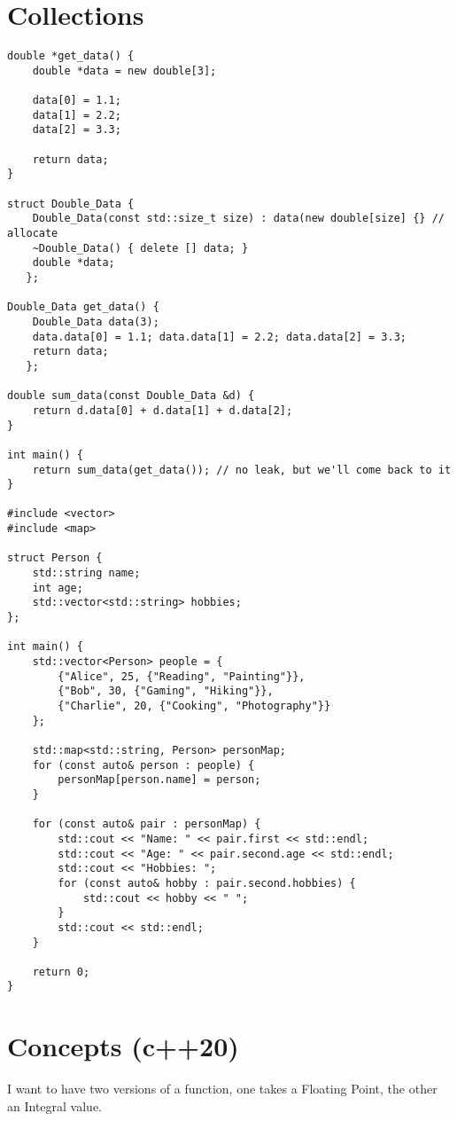 \documentclass[openany]{report}
\begin{document}
\section{Collections}

\begin{verbatim}
double *get_data() {
    double *data = new double[3];

    data[0] = 1.1;
    data[1] = 2.2;
    data[2] = 3.3;

    return data;
}

struct Double_Data {
    Double_Data(const std::size_t size) : data(new double[size] {} // allocate
    ~Double_Data() { delete [] data; }
    double *data;
   };

Double_Data get_data() {
    Double_Data data(3);
    data.data[0] = 1.1; data.data[1] = 2.2; data.data[2] = 3.3;
    return data;
   };

double sum_data(const Double_Data &d) {
    return d.data[0] + d.data[1] + d.data[2];
}

int main() {
    return sum_data(get_data()); // no leak, but we'll come back to it
}

#include <vector>
#include <map>

struct Person {
    std::string name;
    int age;
    std::vector<std::string> hobbies;
};

int main() {
    std::vector<Person> people = {
        {"Alice", 25, {"Reading", "Painting"}},
        {"Bob", 30, {"Gaming", "Hiking"}},
        {"Charlie", 20, {"Cooking", "Photography"}}
    };

    std::map<std::string, Person> personMap;
    for (const auto& person : people) {
        personMap[person.name] = person;
    }

    for (const auto& pair : personMap) {
        std::cout << "Name: " << pair.first << std::endl;
        std::cout << "Age: " << pair.second.age << std::endl;
        std::cout << "Hobbies: ";
        for (const auto& hobby : pair.second.hobbies) {
            std::cout << hobby << " ";
        }
        std::cout << std::endl;
    }

    return 0;
}
\end{verbatim}


\section{Concepts (c++20)}

I want to have two versions of a function, one takes a Floating Point, the other an Integral value.
\end{document}
